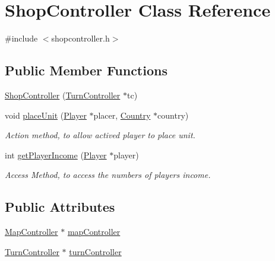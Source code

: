 \hypertarget{class_shop_controller}{}\section{Shop\+Controller Class Reference}
\label{class_shop_controller}


{\ttfamily \#include $<$shopcontroller.\+h$>$}

\subsection*{Public Member Functions}
\begin{DoxyCompactItemize}
\item 
\hyperlink{class_shop_controller_a02945177e65fca47c9cddee1a7b3fdb6}{Shop\+Controller} (\hyperlink{class_turn_controller}{Turn\+Controller} $\ast$tc)
\item 
void \hyperlink{class_shop_controller_a6f1f54172f914d26432bee8cf2f888ed}{place\+Unit} (\hyperlink{class_player}{Player} $\ast$placer, \hyperlink{class_country}{Country} $\ast$country)
\begin{DoxyCompactList}\small\item\em Action method, to allow actived player to place unit. \end{DoxyCompactList}\item 
int \hyperlink{class_shop_controller_acca2acc6d4aa2ad91db60f8461e74ad1}{get\+Player\+Income} (\hyperlink{class_player}{Player} $\ast$player)
\begin{DoxyCompactList}\small\item\em Access Method, to access the numbers of player\textquotesingle{}s income. \end{DoxyCompactList}\end{DoxyCompactItemize}
\subsection*{Public Attributes}
\begin{DoxyCompactItemize}
\item 
\hyperlink{class_map_controller}{Map\+Controller} $\ast$ \hyperlink{class_shop_controller_a44304a0e1de2f28cdcce75b9ae265a83}{map\+Controller}
\item 
\hyperlink{class_turn_controller}{Turn\+Controller} $\ast$ \hyperlink{class_shop_controller_a3d14a370bf604d6f52f3a94749dd1913}{turn\+Controller}
\end{DoxyCompactItemize}


